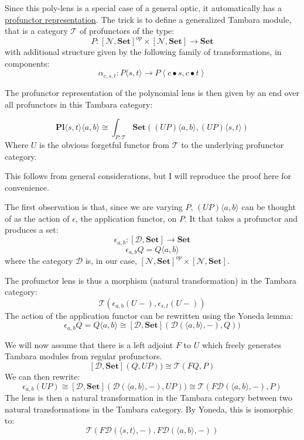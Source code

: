 \documentclass[11pt]{amsart}
\begin{document}
Since this poly-lens is a special case of a general optic, it automatically has a \href{https://arxiv.org/abs/2001.07488}{profunctor representation}. The trick is to define a generalized Tambara module, that is a category $\mathcal{T}$ of profunctors of the type:
\[ P \colon [\mathcal{N}, \mathbf{Set}]^{op}  \times [\mathcal{N}, \mathbf{Set}] \to \mathbf{Set} \]
with additional structure given by the following family of transformations, in components:
\[\alpha_{c, s, t} \colon P\langle s, t \rangle \to P \left \langle c \bullet s, c \bullet t \right \rangle \]

The profunctor representation of the polynomial lens is then given by an end over all profunctors in this Tambara category:

\[  \mathbf{Pl}\langle s, t\rangle \langle a, b\rangle \cong \int_{P \colon \mathcal{T}} \mathbf{Set}\left ( (U P)\langle a, b \rangle, (U P) \langle s, t \rangle \right) \]
Where $U$ is the obvious forgetful functor from $\mathcal{T}$ to the underlying profunctor category.

This follows from general considerations, but I will reproduce the proof here for convenience. 

The first observation is that, since we are varying $P$,  $(U P)\langle a, b \rangle$ can be thought of as the action of $\epsilon$, the application functor, on $P$. It that takes a profunctor and produces a set:
\[ \epsilon_{a, b} \colon [\mathcal{D}, \mathbf{Set}] \to \mathbf{Set} \]
\[ \epsilon_{a, b} Q = Q\langle a, b \rangle \]
where the category $\mathcal{D}$ is, in our case, $[\mathcal{N}, \mathbf{Set}]^{op}  \times [\mathcal{N}, \mathbf{Set}]$. 

The profunctor lens is thus a morphism (natural transformation) in the Tambara category:
\[ \mathcal{T} ( \epsilon_{a, b} (U -),  \epsilon_{s, t} (U -)) \]
The action of the application functor can be rewritten using the Yoneda lemma:
\[ \epsilon_{a, b} Q = Q\langle a, b \rangle \cong  [\mathcal{D}, \mathbf{Set}]( \mathcal{D}(\langle a, b \rangle, -), Q))\]

We will now assume that there is a left adjoint $F$ to $U$ which freely generates Tambara modules from regular profunctors. 
\[ [\mathcal{D}, \mathbf{Set}](Q, U P)) \cong \mathcal{T}( F Q, P) \]
We can then rewrite:
\[ \epsilon_{a, b} (U P) \cong [\mathcal{D}, \mathbf{Set}]( \mathcal{D}(\langle a, b \rangle, -), U P)) \cong \mathcal{T}( F \mathcal{D}( \langle a, b \rangle, -), P)\]
The lens is then a natural transformation in the Tambara category between two natural transformations in the Tambara category. By Yoneda, this is isomorphic to:
\[ \mathcal{T} (F \mathcal{D}( \langle s, t \rangle, -), F \mathcal{D}( \langle a, b \rangle, -)) \]
\end{document}
